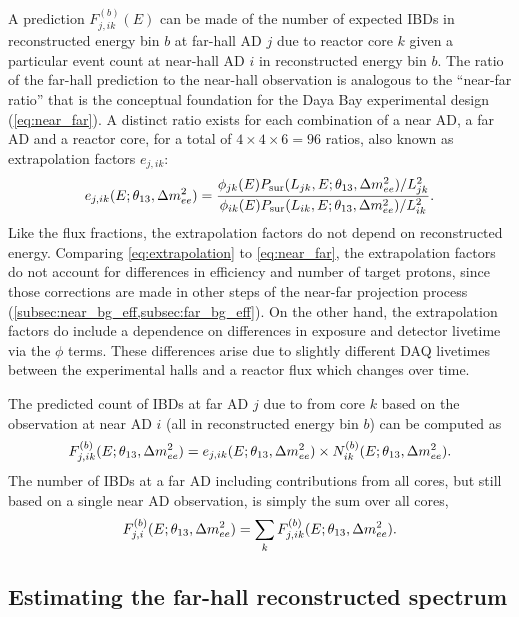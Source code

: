 A prediction $F_{j,ik}^{(b)}(E)$ can be made of the number of expected IBDs
in reconstructed energy bin $b$
at far-hall AD $j$ due to reactor core $k$
given a particular event count at near-hall AD $i$ in reconstructed energy bin $b$.
The ratio of the far-hall prediction to the near-hall observation
is analogous to the ``near-far ratio''
that is the conceptual foundation
for the Daya Bay experimental design (\cref{eq:near_far}).
A distinct ratio exists for each combination of a near AD, a far AD and a reactor core,
for a total of $4 \times 4 \times 6 = 96$ ratios, also known as extrapolation factors
$e_{j,ik}$:
\begin{equation}\label{eq:extrapolation}
    e_{j,ik}(E;\theta_{13},\Delta m^2_{ee}) = \frac{
        \phi_{jk}(E)P_\text{sur}(L_{jk}, E;\theta_{13},\Delta m^2_{ee})/L_{jk}^2}{
        \phi_{ik}(E)P_\text{sur}(L_{ik}, E;\theta_{13},\Delta m^2_{ee})/L_{ik}^2
    }.
\end{equation}
Like the flux fractions, the extrapolation factors
do not depend on reconstructed energy.
Comparing \cref{eq:extrapolation} to \cref{eq:near_far}, the extrapolation factors
do not account for differences in efficiency and number of target protons,
since those corrections are made in other steps of the near-far projection process
(\cref{subsec:near_bg_eff,subsec:far_bg_eff}).
On the other hand, the extrapolation factors do include a dependence on
differences in \nuebar{} exposure and detector livetime via the $\phi$ terms.
These differences arise due to slightly different DAQ livetimes
between the experimental halls
and a reactor flux which changes over time.

The predicted count of IBDs at far AD $j$ due to \nuebar{} from core $k$
based on the observation at near AD $i$ (all in reconstructed energy bin $b$) can be computed as
\begin{equation}
    F_{j,ik}^{(b)}(E;\theta_{13},\Delta m^2_{ee}) = e_{j,ik}(E;\theta_{13},\Delta m^2_{ee}) \times
        N_{ik}^{(b)}(E;\theta_{13},\Delta m^2_{ee}).
\end{equation}
The number of IBDs at a far AD including contributions from all cores,
but still based on a single near AD observation,
is simply the sum over all cores,
\begin{equation}
    F_{j,i}^{(b)}(E;\theta_{13},\Delta m^2_{ee}) = \sum_k F_{j,ik}^{(b)}(E;\theta_{13},\Delta m^2_{ee}).
\end{equation}

\subsection{Estimating the far-hall reconstructed spectrum}
\label{subsec:true_to_reco_farhall}

